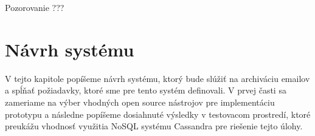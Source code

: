 \documentclass[11pt,twoside,a4paper]{book}
\begin{document}
Pozorovanie ???

% 
% 
% 
% 
% 
% 


\chapter{Návrh systému}

V tejto kapitole popíšeme návrh systému, ktorý bude slúžiť na archiváciu emailov a spĺňať požiadavky, ktoré sme pre tento systém definovali. V prvej časti sa zameriame na výber vhodných open source nástrojov pre implementáciu prototypu a následne popíšeme dosiahnuté výsledky v testovacom prostredí, ktoré preukážu vhodnosť využitia NoSQL systému Cassandra pre riešenie tejto úlohy.
\end{document}
